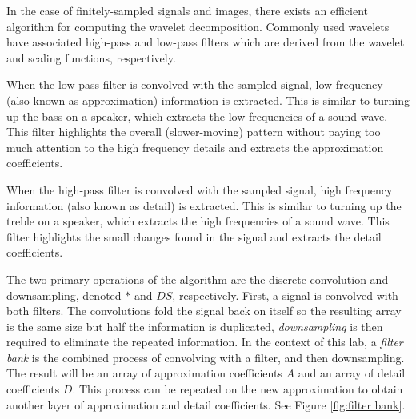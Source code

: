 \begin{comment}
In the case of finitely-sampled signals and images, only finitely many wavelet coefficients are nonzero.
Depending on the application, we are often only interested in the coefficients corresponding to a subset of the basis functions.
Since a given family of wavelets forms an orthogonal set, we can compute the wavelet coefficients
by taking inner products (i.e. by integrating). This direct approach is not particularly efficient,
however. Just as there are fast algorithms for computing the Fourier transform (e.g. the FFT),
we can efficiently calculate wavelet coefficients using techniques from signal processing.
In particular, we will use an \emph{iterative filter bank} to compute the transform.
\end{comment}

In the case of finitely-sampled signals and images, there exists an efficient algorithm for computing the wavelet decomposition.
Commonly used wavelets have associated high-pass and low-pass filters which are derived from the wavelet and scaling functions, respectively.

When the low-pass filter is convolved with the sampled signal, low frequency (also known as approximation) information is extracted.
This is similar to turning up the bass on a speaker, which extracts the low frequencies of a sound wave.
This filter highlights the overall (slower-moving) pattern without paying too much attention to the high frequency details and extracts the approximation coefficients.%

When the high-pass filter is convolved with the sampled signal, high frequency information (also known as detail) is extracted.
This is similar to turning up the treble on a speaker, which extracts the high frequencies of a sound wave.
This filter highlights the small changes found in the signal and extracts the detail coefficients.

The two primary operations of the algorithm are the discrete convolution and downsampling, denoted $*$ and $DS$, respectively.
First, a signal is convolved with both filters.
The convolutions fold the signal back on itself so the resulting array is the same size but half the information is duplicated, \emph{downsampling} is then required to eliminate the repeated information.
In the context of this lab, a \emph{filter bank} is the combined process of convolving with a filter, and then downsampling.
The result will be an array of approximation coefficients $A$ and an array of detail coefficients $D$.
This process can be repeated on the new approximation to obtain another layer of approximation and detail coefficients.
See Figure \ref{fig:filter bank}.

